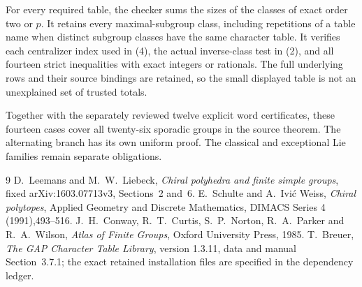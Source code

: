 \documentclass[11pt,a4paper]{article}
\begin{document}
For every required table, the checker sums the sizes of the classes
of exact order two or $p$. It retains every maximal-subgroup class,
including repetitions of a table name when distinct subgroup classes
have the same character table. It verifies each centralizer index
used in (4), the actual inverse-class test in (2), and all fourteen
strict inequalities with exact integers or rationals. The full
underlying rows and their source bindings are retained, so the small
displayed table is not an unexplained set of trusted totals.

Together with the separately reviewed twelve explicit word
certificates, these fourteen cases cover all twenty-six sporadic
groups in the source theorem. The alternating branch has its own
uniform proof. The classical and exceptional Lie families remain
separate obligations. 
\begin{thebibliography}{9}
 D.~Leemans and M.~W.~Liebeck, \emph{Chiral polyhedra and
finite simple groups}, fixed arXiv:1603.07713v3, Sections~2 and~6.
 E.~Schulte and A.~Ivi\'c Weiss, \emph{Chiral polytopes},
Applied Geometry and Discrete Mathematics, DIMACS Series 4 (1991),493--516.
 J.~H.~Conway, R.~T.~Curtis, S.~P.~Norton, R.~A.~Parker
and R.~A.~Wilson, \emph{Atlas of Finite Groups}, Oxford University Press, 1985.
 T.~Breuer, \emph{The GAP Character Table Library},
version 1.3.11, data and manual Section~3.7.1; the exact retained
installation files are specified in the dependency ledger.
\end{thebibliography}
\end{document}
